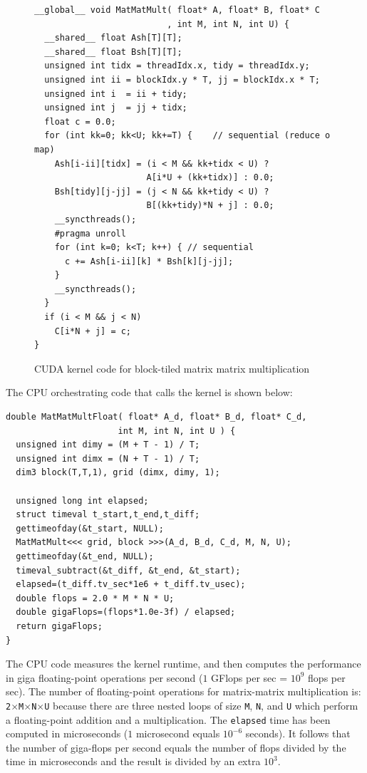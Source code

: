 \documentclass[acmsmall,review]{acmart}\settopmatter{printfolios=true,printccs=false,printacmref=false}
\begin{document}
\begin{figure}
\begin{lstlisting}[mathescape=true]
__global__ void MatMatMult( float* A, float* B, float* C
                          , int M, int N, int U) {
  __shared__ float Ash[T][T];
  __shared__ float Bsh[T][T];
  unsigned int tidx = threadIdx.x, tidy = threadIdx.y;
  unsigned int ii = blockIdx.y * T, jj = blockIdx.x * T;
  unsigned int i  = ii + tidy;
  unsigned int j  = jj + tidx;
  float c = 0.0;
  for (int kk=0; kk<U; kk+=T) {    // sequential (reduce o map)
    Ash[i-ii][tidx] = (i < M && kk+tidx < U) ? 
                      A[i*U + (kk+tidx)] : 0.0;
    Bsh[tidy][j-jj] = (j < N && kk+tidy < U) ? 
                      B[(kk+tidy)*N + j] : 0.0;
    __syncthreads();
    #pragma unroll
    for (int k=0; k<T; k++) { // sequential
      c += Ash[i-ii][k] * Bsh[k][j-jj];
    }
    __syncthreads();
  }
  if (i < M && j < N)
    C[i*N + j] = c;
}
\end{lstlisting}\vspace{-4ex}
\caption{CUDA kernel code for block-tiled matrix matrix multiplication}
\label{fig-mat-mat-mul-kernel}
\end{figure}

The CPU orchestrating code that calls the kernel is shown below:
\begin{lstlisting}[mathescape=true]
double MatMatMultFloat( float* A_d, float* B_d, float* C_d, 
                      int M, int N, int U ) {
  unsigned int dimy = (M + T - 1) / T;
  unsigned int dimx = (N + T - 1) / T;
  dim3 block(T,T,1), grid (dimx, dimy, 1);

  unsigned long int elapsed;
  struct timeval t_start,t_end,t_diff;
  gettimeofday(&t_start, NULL);
  MatMatMult<<< grid, block >>>(A_d, B_d, C_d, M, N, U);
  gettimeofday(&t_end, NULL);
  timeval_subtract(&t_diff, &t_end, &t_start);
  elapsed=(t_diff.tv_sec*1e6 + t_diff.tv_usec);
  double flops = 2.0 * M * N * U;
  double gigaFlops=(flops*1.0e-3f) / elapsed;
  return gigaFlops;
}
\end{lstlisting}\vspace{-1ex}
The CPU code measures the kernel runtime, and then computes the performance in
giga floating-point operations per second ($1$ GFlops per sec = $10^9$ 
flops per sec). The number of floating-point operations for matrix-matrix 
multiplication is: {\tt 2$\times$M$\times$N$\times$U} because there
are three nested loops of size {\tt M}, {\tt N}, and {\tt U} which perform
a floating-point addition and a multiplication.  The {\tt elapsed} time
has been computed in microseconds ($1$ microsecond equals $10^{-6}$ seconds).
It follows that the number of giga-flops per second equals the number of
flops divided by the time in microseconds and the result is divided by 
an extra $10^{3}$.
\end{document}
